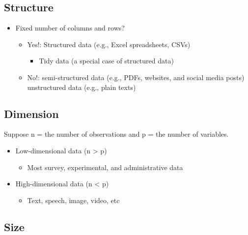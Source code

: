 \documentclass[
]{book}
\providecommand{\tightlist}{%
  \setlength{\itemsep}{0pt}\setlength{\parskip}{0pt}}
\begin{document}
\hypertarget{structure}{%
\subsection{Structure}\label{structure}}

\begin{itemize}
\item
  Fixed number of columns and rows?

  \begin{itemize}
  \item
    Yes!: Structured data (e.g., Excel spreadsheets, CSVs)

    \begin{itemize}
    \tightlist
    \item
      Tidy data (a special case of structured data)
    \end{itemize}
  \item
    No!: semi-structured data (e.g., PDFs, websites, and social media posts) unstructured data (e.g., plain texts)
  \end{itemize}
\end{itemize}

\hypertarget{dimension}{%
\subsection{Dimension}\label{dimension}}

Suppose n = the number of observations and p = the number of variables.

\begin{itemize}
\item
  Low-dimensional data (n \textgreater{} p)

  \begin{itemize}
  \tightlist
  \item
    Most survey, experimental, and administrative data
  \end{itemize}
\item
  High-dimensional data (n \textless{} p)

  \begin{itemize}
  \tightlist
  \item
    Text, speech, image, video, etc
  \end{itemize}
\end{itemize}

\hypertarget{size}{%
\subsection{Size}\label{size}}
\end{document}
